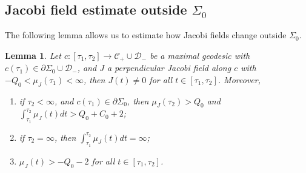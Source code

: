 \documentclass[10pt]{amsart}
\newenvironment{enumeratei}
{\bgroup\def\theenumi{\roman{enumi}}\def\theenumii{\arabic{enumii}}\begin{enumerate}}
{\end{enumerate}\egroup}
\newtheorem{lemma}[theorem]{Lemma}
\theoremstyle{definition}
\renewcommand{\>}{{\rangle}}
\newcommand{\<}{{\langle}}
\begin{document}
\subsection{Jacobi field estimate outside \texorpdfstring{$\Sigma_0$}{Sigma}}

The following lemma allows us to estimate how Jacobi fields change outside $\Sigma_0$.
\begin{lemma}\label{lem: mu_change_NSigma}
Let $c: [\tau_1,\tau_2]\to \mathcal{C}_+\cup\mathcal{D}_-$ be a maximal geodesic with $c(\tau_1)\in \partial\Sigma_0\cup \mathcal{D}_-$, and
$J$ a perpendicular Jacobi field along $c$ with $-Q_0<\mu_J(\tau_1)<\infty$, then $J(t)\neq 0$ for all $t\in[\tau_1,\tau_2]$. Moreover,
\begin{enumeratei}
\item\label{lem: mu_change_NSigmai}\label{tau2_finite} if $\tau_2<\infty$, and $c(\tau_1)\in \partial\Sigma_0$, then $\mu_J(\tau_2)>Q_0$ and $\int_{\tau_1}^{\tau_2}\mu_J(t)dt>Q_0+C_0+2$;

\item\label{tau2_infinite} if $\tau_2=\infty$, then $\int_{\tau_1}^{\tau_2}\mu_J(t)dt=\infty$;

\item\label{boundontau12} $\mu_J(t)>-Q_0-2$ for all $t\in[\tau_1,\tau_2]$.
\end{enumeratei}
\end{lemma}
\end{document}
